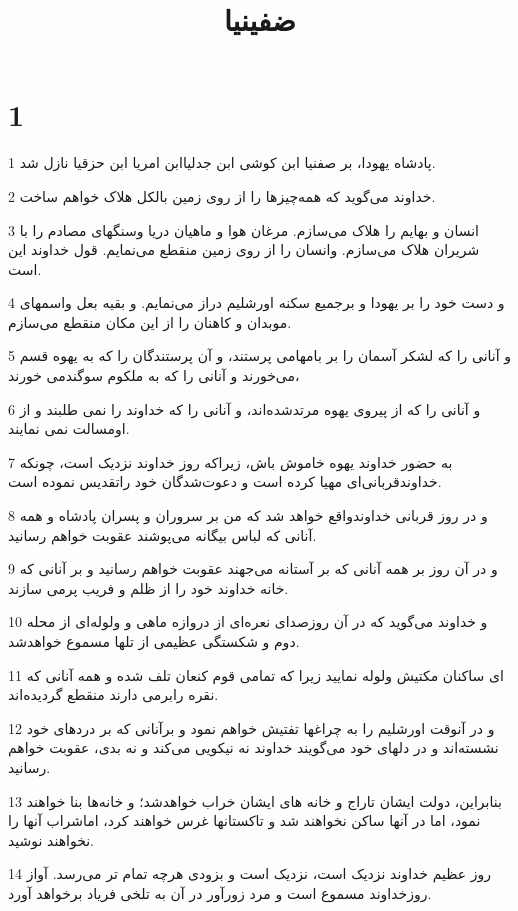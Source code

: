 

\title{ضفينيا}


\chapter{1}

\par 1 پادشاه یهودا، بر صفنیا ابن کوشی ابن جدلیاابن امریا ابن حزقیا نازل شد.
\par 2 خداوند می‌گوید که همه‌چیزها را از روی زمین بالکل هلاک خواهم ساخت.
\par 3 انسان و بهایم را هلاک می‌سازم. مرغان هوا و ماهیان دریا وسنگهای مصادم را با شریران هلاک می‌سازم. وانسان را از روی زمین منقطع می‌نمایم. قول خداوند این است.
\par 4 و دست خود را بر یهودا و برجمیع سکنه اورشلیم دراز می‌نمایم. و بقیه بعل واسمهای موبدان و کاهنان را از این مکان منقطع می‌سازم.
\par 5 و آنانی را که لشکر آسمان را بر بامهامی پرستند، و آن پرستندگان را که به یهوه قسم می‌خورند و آنانی را که به ملکوم سوگندمی خورند،
\par 6 و آنانی را که از پیروی یهوه مرتدشده‌اند، و آنانی را که خداوند را نمی طلبند و از اومسالت نمی نمایند.
\par 7 به حضور خداوند یهوه خاموش باش، زیراکه روز خداوند نزدیک است، چونکه خداوندقربانی‌ای مهیا کرده است و دعوت‌شدگان خود راتقدیس نموده است.
\par 8 و در روز قربانی خداوندواقع خواهد شد که من بر سروران و پسران پادشاه و همه آنانی که لباس بیگانه می‌پوشند عقوبت خواهم رسانید.
\par 9 و در آن روز بر همه آنانی که بر آستانه می‌جهند عقوبت خواهم رسانید و بر آنانی که خانه خداوند خود را از ظلم و فریب پرمی سازند.
\par 10 و خداوند می‌گوید که در آن روزصدای نعره‌ای از دروازه ماهی و ولوله‌ای از محله دوم و شکستگی عظیمی از تلها مسموع خواهدشد.
\par 11 ‌ای ساکنان مکتیش ولوله نمایید زیرا که تمامی قوم کنعان تلف شده و همه آنانی که نقره رابرمی دارند منقطع گردیده‌اند.
\par 12 و در آنوقت اورشلیم را به چراغها تفتیش خواهم نمود و برآنانی که بر دردهای خود نشسته‌اند و در دلهای خود می‌گویند خداوند نه نیکویی می‌کند و نه بدی، عقوبت خواهم رسانید.
\par 13 بنابراین، دولت ایشان تاراج و خانه های ایشان خراب خواهدشد؛ و خانه‌ها بنا خواهند نمود، اما در آنها ساکن نخواهند شد و تاکستانها غرس خواهند کرد، اماشراب آنها را نخواهند نوشید.
\par 14 روز عظیم خداوند نزدیک است، نزدیک است و بزودی هرچه تمام تر می‌رسد. آواز روزخداوند مسموع است و مرد زورآور در آن به تلخی فریاد برخواهد آورد.
